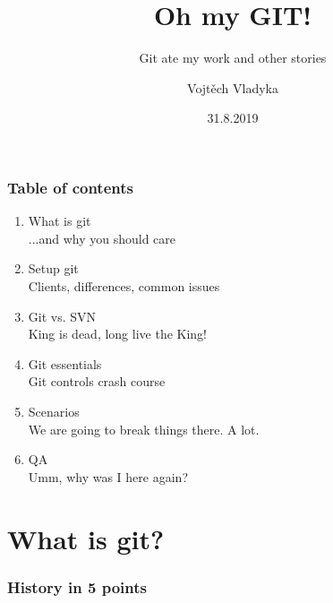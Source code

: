 \documentclass{beamer}
\title{Oh my GIT!}
\subtitle{Git ate my work and other stories}
\author{Vojtěch Vladyka}
\date{31.8.2019}
\begin{document}
    \frame{\titlepage}
    \begin{frame}
       \frametitle{Table of contents}
       \begin{enumerate}
           \item What is git
           \\   \textcolor{solarizedRebase01}{\footnotesize\hspace{1em} ...and why you should care}	
           \item Setup git
           \\   \textcolor{solarizedRebase01}{\footnotesize\hspace{1em} Clients, differences, common issues}	
           \item Git vs. SVN
           \\   \textcolor{solarizedRebase01}{\footnotesize\hspace{1em} King is dead, long live the King!}	
           \item Git essentials
           \\   \textcolor{solarizedRebase01}{\footnotesize\hspace{1em} Git controls crash course}	
           \item Scenarios
           \\   \textcolor{solarizedRebase01}{\footnotesize\hspace{1em} We are going to break things there. A lot.}	
           \item QA
           \\   \textcolor{solarizedRebase01}{\footnotesize\hspace{1em} Umm, why was I here again?}
       \end{enumerate}
    \end{frame}
    
    \section{What is git?}
    \begin{frame}
        \frametitle{History in 5 points}
    \end{frame}
    
\end{document}
